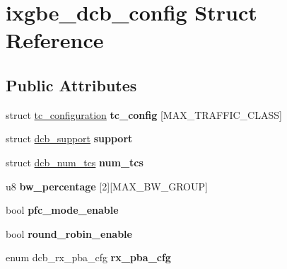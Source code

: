 \hypertarget{structixgbe__dcb__config}{
\section{ixgbe\_\-dcb\_\-config Struct Reference}
\label{structixgbe__dcb__config}
}
\subsection*{Public Attributes}
\begin{DoxyCompactItemize}
\item 
\hypertarget{structixgbe__dcb__config_ab76d39da50c5a256d98cf0a1799214d8}{
struct \hyperlink{structtc__configuration}{tc\_\-configuration} {\bfseries tc\_\-config} \mbox{[}MAX\_\-TRAFFIC\_\-CLASS\mbox{]}}
\label{structixgbe__dcb__config_ab76d39da50c5a256d98cf0a1799214d8}

\item 
\hypertarget{structixgbe__dcb__config_a28fbb2fef1e7880a71f48315330534e0}{
struct \hyperlink{structdcb__support}{dcb\_\-support} {\bfseries support}}
\label{structixgbe__dcb__config_a28fbb2fef1e7880a71f48315330534e0}

\item 
\hypertarget{structixgbe__dcb__config_ae6ee0e5e8b94a86709a5fcd204b2f734}{
struct \hyperlink{structdcb__num__tcs}{dcb\_\-num\_\-tcs} {\bfseries num\_\-tcs}}
\label{structixgbe__dcb__config_ae6ee0e5e8b94a86709a5fcd204b2f734}

\item 
\hypertarget{structixgbe__dcb__config_a777dea8a9050c120800c59600176e334}{
u8 {\bfseries bw\_\-percentage} \mbox{[}2\mbox{]}\mbox{[}MAX\_\-BW\_\-GROUP\mbox{]}}
\label{structixgbe__dcb__config_a777dea8a9050c120800c59600176e334}

\item 
\hypertarget{structixgbe__dcb__config_ae167fdfec45bd574602b969bd96fc38b}{
bool {\bfseries pfc\_\-mode\_\-enable}}
\label{structixgbe__dcb__config_ae167fdfec45bd574602b969bd96fc38b}

\item 
\hypertarget{structixgbe__dcb__config_abad44c8f7633e779d87ea6827adeefb8}{
bool {\bfseries round\_\-robin\_\-enable}}
\label{structixgbe__dcb__config_abad44c8f7633e779d87ea6827adeefb8}

\item 
\hypertarget{structixgbe__dcb__config_aa3435239a03ed1ca7f075384af04e658}{
enum dcb\_\-rx\_\-pba\_\-cfg {\bfseries rx\_\-pba\_\-cfg}}
\label{structixgbe__dcb__config_aa3435239a03ed1ca7f075384af04e658}


\end{DoxyCompactItemize}
